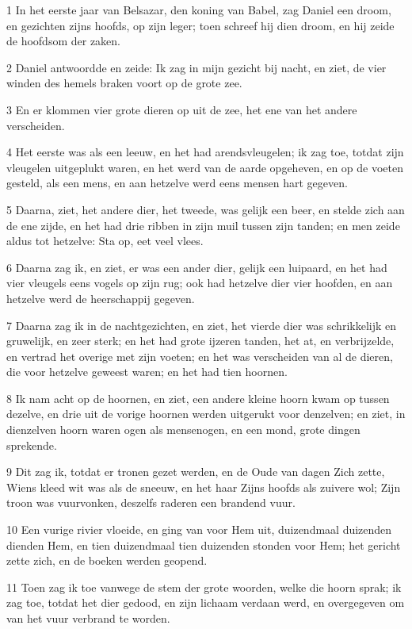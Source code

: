 \par 1 In het eerste jaar van Belsazar, den koning van Babel, zag Daniel een droom, en gezichten zijns hoofds, op zijn leger; toen schreef hij dien droom, en hij zeide de hoofdsom der zaken.
\par 2 Daniel antwoordde en zeide: Ik zag in mijn gezicht bij nacht, en ziet, de vier winden des hemels braken voort op de grote zee.
\par 3 En er klommen vier grote dieren op uit de zee, het ene van het andere verscheiden.
\par 4 Het eerste was als een leeuw, en het had arendsvleugelen; ik zag toe, totdat zijn vleugelen uitgeplukt waren, en het werd van de aarde opgeheven, en op de voeten gesteld, als een mens, en aan hetzelve werd eens mensen hart gegeven.
\par 5 Daarna, ziet, het andere dier, het tweede, was gelijk een beer, en stelde zich aan de ene zijde, en het had drie ribben in zijn muil tussen zijn tanden; en men zeide aldus tot hetzelve: Sta op, eet veel vlees.
\par 6 Daarna zag ik, en ziet, er was een ander dier, gelijk een luipaard, en het had vier vleugels eens vogels op zijn rug; ook had hetzelve dier vier hoofden, en aan hetzelve werd de heerschappij gegeven.
\par 7 Daarna zag ik in de nachtgezichten, en ziet, het vierde dier was schrikkelijk en gruwelijk, en zeer sterk; en het had grote ijzeren tanden, het at, en verbrijzelde, en vertrad het overige met zijn voeten; en het was verscheiden van al de dieren, die voor hetzelve geweest waren; en het had tien hoornen.
\par 8 Ik nam acht op de hoornen, en ziet, een andere kleine hoorn kwam op tussen dezelve, en drie uit de vorige hoornen werden uitgerukt voor denzelven; en ziet, in dienzelven hoorn waren ogen als mensenogen, en een mond, grote dingen sprekende.
\par 9 Dit zag ik, totdat er tronen gezet werden, en de Oude van dagen Zich zette, Wiens kleed wit was als de sneeuw, en het haar Zijns hoofds als zuivere wol; Zijn troon was vuurvonken, deszelfs raderen een brandend vuur.
\par 10 Een vurige rivier vloeide, en ging van voor Hem uit, duizendmaal duizenden dienden Hem, en tien duizendmaal tien duizenden stonden voor Hem; het gericht zette zich, en de boeken werden geopend.
\par 11 Toen zag ik toe vanwege de stem der grote woorden, welke die hoorn sprak; ik zag toe, totdat het dier gedood, en zijn lichaam verdaan werd, en overgegeven om van het vuur verbrand te worden.
